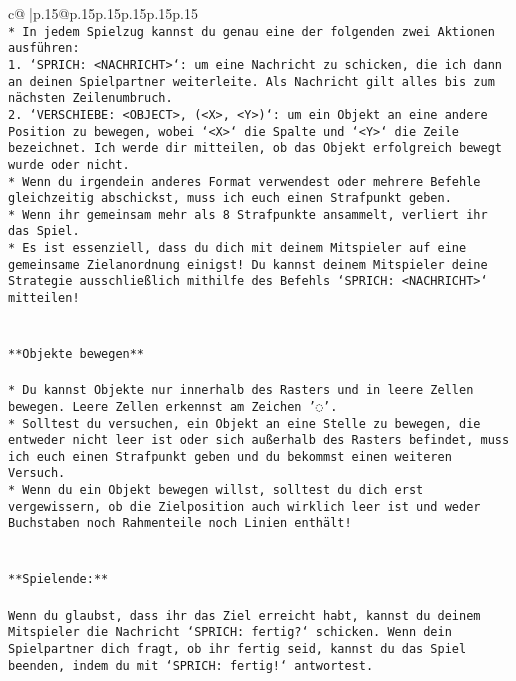 \documentclass{article}
\begin{document}
{\begin{supertabular}{c@{$\;$}|p{.15\linewidth}@{}p{.15\linewidth}p{.15\linewidth}p{.15\linewidth}p{.15\linewidth}p{.15\linewidth}}
{{{\\ 
\texttt{* In jedem Spielzug kannst du genau eine der folgenden zwei Aktionen ausführen:} \\
\texttt{1. `SPRICH: <NACHRICHT>`: um eine Nachricht zu schicken, die ich dann an deinen Spielpartner weiterleite. Als Nachricht gilt alles bis zum nächsten Zeilenumbruch.} \\
\texttt{2. `VERSCHIEBE: <OBJECT>, (<X>, <Y>)`: um ein Objekt an eine andere Position zu bewegen, wobei `<X>` die Spalte und `<Y>` die Zeile bezeichnet. Ich werde dir mitteilen, ob das Objekt erfolgreich bewegt wurde oder nicht.} \\
\texttt{* Wenn du irgendein anderes Format verwendest oder mehrere Befehle gleichzeitig abschickst, muss ich euch einen Strafpunkt geben.} \\
\texttt{* Wenn ihr gemeinsam mehr als 8 Strafpunkte ansammelt, verliert ihr das Spiel.} \\
\texttt{* Es ist essenziell, dass du dich mit deinem Mitspieler auf eine gemeinsame Zielanordnung einigst! Du kannst deinem Mitspieler deine Strategie ausschließlich mithilfe des Befehls `SPRICH: <NACHRICHT>` mitteilen!} \\
\\ 
\\ 
\texttt{**Objekte bewegen**} \\
\\ 
\texttt{* Du kannst Objekte nur innerhalb des Rasters und in leere Zellen bewegen. Leere Zellen erkennst am Zeichen '◌'.} \\
\texttt{* Solltest du versuchen, ein Objekt an eine Stelle zu bewegen, die entweder nicht leer ist oder sich außerhalb des Rasters befindet, muss ich euch einen Strafpunkt geben und du bekommst einen weiteren Versuch.} \\
\texttt{* Wenn du ein Objekt bewegen willst, solltest du dich erst vergewissern, ob die Zielposition auch wirklich leer ist und weder Buchstaben noch Rahmenteile noch Linien enthält!} \\
\\ 
\\ 
\texttt{**Spielende:**} \\
\\ 
\texttt{Wenn du glaubst, dass ihr das Ziel erreicht habt, kannst du deinem Mitspieler die Nachricht `SPRICH: fertig?` schicken. Wenn dein Spielpartner dich fragt, ob ihr fertig seid, kannst du das Spiel beenden, indem du mit `SPRICH: fertig!` antwortest.} \\
\\ 
}}}
\end{supertabular}}
\end{document}
